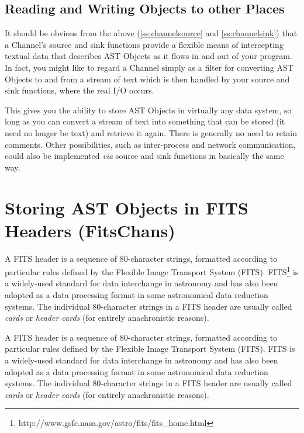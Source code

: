 \documentclass[twoside,11pt]{article}
\newcommand{\htmladdnormallink}[2]{#1}
\newenvironment{latexonly}{}{}
\newcommand{\htmlref}[2]{#1}
\newcommand{\secref}[1]{\S\ref{#1}}
\renewcommand{\secref}[1]{\ref{#1}}
\begin{document}
\subsection{\label{ss:otherplaces}Reading and Writing Objects to other Places}

It should be obvious from the above (\secref{ss:channelsource} and
\secref{ss:channelsink}) that a \htmlref{Channel}{Channel}'s source and sink functions
provide a flexible means of intercepting textual data that describes
AST Objects as it flows in and out of your program. In fact, you might
like to regard a Channel simply as a filter for converting AST Objects
to and from a stream of text which is then handled by your source and
sink functions, where the real I/O occurs.

This gives you the ability to store AST Objects in virtually any data
system, so long as you can convert a stream of text into something
that can be stored (it need no longer be text) and retrieve it
again. There is generally no need to retain comments.  Other
possibilities, such as inter-process and network communication, could
also be implemented {\em{via}} source and sink functions in basically
the same way.

\cleardoublepage
%
\section{\label{ss:nativefits}Storing AST Objects in FITS Headers (FitsChans)}

\begin{latexonly}
A FITS header is a sequence of 80-character strings, formatted
according to particular rules defined by the Flexible Image Transport
\htmlref{System}{System}
(FITS). FITS\footnote{http://www.gsfc.nasa.gov/astro/fits/fits\_home.html}
is a widely-used standard for data interchange in astronomy and has
also been adopted as a data processing format in some astronomical
data reduction systems.  The individual 80-character strings in a FITS
header are usually called {\em{cards}} or {\em{header cards}} (for
entirely anachronistic reasons).
\end{latexonly}
\begin{htmlonly}
A FITS header is a sequence of 80-character strings, formatted
according to particular rules defined by the Flexible Image Transport
System (FITS).
\htmladdnormallink{FITS}{http://www.gsfc.nasa.gov/astro/fits/fits_home.html}
is a widely-used standard for data interchange in astronomy and has
also been adopted as a data processing format in some astronomical
data reduction systems.  The individual 80-character strings in a FITS
header are usually called {\em{cards}} or {\em{header cards}} (for
entirely anachronistic reasons).
\end{htmlonly}
\end{document}
